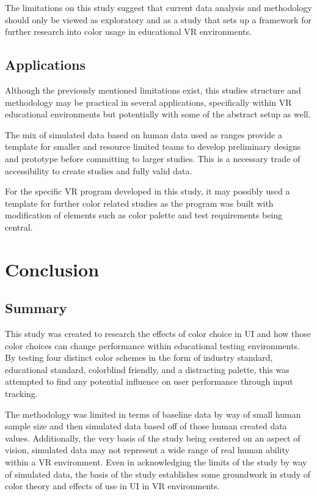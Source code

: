 \documentclass[acmlarge]{acmart}
\begin{document}
The limitations on this study suggest that current data analysis and methodology should only be viewed as exploratory and as a study that sets up a framework for further research into color usage in educational VR environments.

\subsection{Applications}
Although the previously mentioned limitations exist, this studies structure and methodology may be practical in several applications, specifically within VR educational environments but potentially with some of the abstract setup as well.

The mix of simulated data based on human data used as ranges provide a template for smaller and resource limited teams to develop preliminary designs and prototype before committing to larger studies. This is a necessary trade of accessibility to create studies and fully valid data.

For the specific VR program developed in this study, it may possibly used a template for further color related studies as the program was built with modification of elements such as color palette and test requirements being central.

\section{Conclusion}
\subsection{Summary}
This study was created to research the effects of color choice in UI and how those color choices can change performance within educational testing environments. By testing four distinct color schemes in the form of industry standard, educational standard, colorblind friendly, and a distracting palette, this was attempted to find any potential influence on user performance through input tracking.

The methodology was limited in terms of baseline data by way of small human sample size and then simulated data based off of those human created data values. Additionally, the very basis of the study being centered on an aspect of vision, simulated data may not represent a wide range of real human ability within a VR environment.
Even in acknowledging the limits of the study by way of simulated data, the basis of the study establishes some groundwork in study of color theory and effects of use in UI in VR environments.
\end{document}
